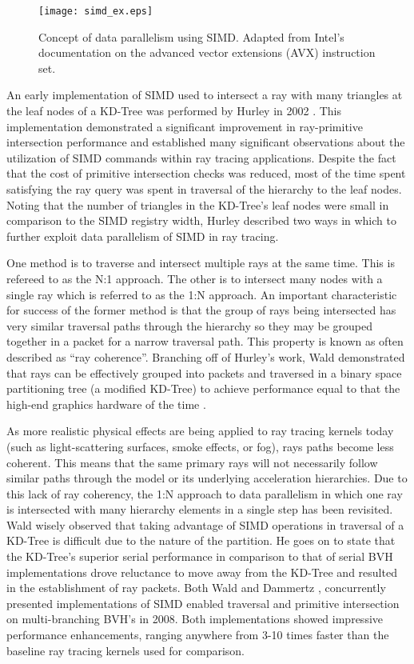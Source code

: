 \begin{figure}
  \centering
  \texttt{[image: simd\_ex.eps]}
  \caption{Concept of data parallelism using SIMD. Adapted from Intel's
    documentation on the advanced vector extensions (AVX) instruction
    set. \cite{Intel_AVX}}
  \label{fig:simd}
\end{figure}

An early implementation of SIMD used to intersect a ray with many triangles at
the leaf nodes of a KD-Tree was performed by Hurley in 2002
\cite{Hurley_2002}. This implementation demonstrated a significant improvement in
ray-primitive intersection performance and established many significant
observations about the utilization of SIMD commands within ray tracing
applications. Despite the fact that the cost of primitive intersection checks
was reduced, most of the time spent satisfying the ray query was spent in
traversal of the hierarchy to the leaf nodes. Noting that the number of
triangles in the KD-Tree's leaf nodes were small in comparison to the SIMD
registry width, Hurley described two ways in which to further exploit data
parallelism of SIMD in ray tracing.

One method is to traverse and intersect multiple rays at the same time. This is
refereed to as the N:1 approach. The other is to intersect many nodes with a
single ray which is referred to as the 1:N approach. An important characteristic
for success of the former method is that the group of rays being intersected has
very similar traversal paths through the hierarchy so they may be grouped
together in a packet for a narrow traversal path. This property is known as
often described as ``ray coherence''. Branching off of Hurley's work, Wald
demonstrated that rays can be effectively grouped into packets and traversed in
a binary space partitioning tree (a modified KD-Tree) to achieve performance
equal to that the high-end graphics hardware of the time \cite{Wald_2001}.

As more realistic physical effects are being applied to ray tracing kernels
today (such as light-scattering surfaces, smoke effects, or fog), rays paths
become less coherent. This means that the same primary rays will not necessarily
follow similar paths through the model or its underlying acceleration
hierarchies. Due to this lack of ray coherency, the 1:N approach to data
parallelism in which one ray is intersected with many hierarchy elements in a
single step has been revisited. Wald wisely observed that taking
advantage of SIMD operations in traversal of a KD-Tree is difficult due to the
nature of the partition. He goes on to state that the KD-Tree's superior serial
performance in comparison to that of serial BVH implementations drove reluctance
to move away from the KD-Tree and resulted in the establishment of ray
packets. \cite{Wald_2008} Both Wald and Dammertz \cite{Dammertz_2008},
concurrently presented implementations of SIMD enabled traversal and primitive
intersection on multi-branching BVH's in 2008. Both implementations showed
impressive performance enhancements, ranging anywhere from 3-10 times faster
than the baseline ray tracing kernels used for comparison.

